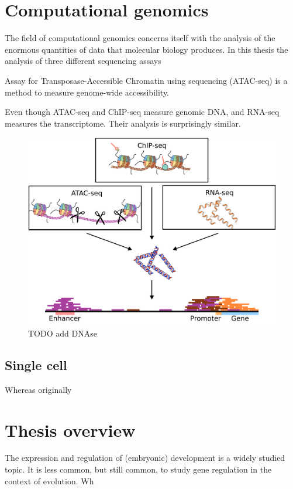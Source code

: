 \section{Computational genomics}

The field of computational genomics concerns itself with the analysis of the enormous quantities of data that molecular biology produces. In this thesis the analysis of three different sequencing assays 

Assay for Transposase-Accessible Chromatin using sequencing (ATAC-seq) is a method to measure genome-wide accessibility. 

Even though ATAC-seq and ChIP-seq measure genomic DNA, and RNA-seq measures the transcriptome. Their analysis is surprisingly similar. 

\begin{figure}[H]
    \includegraphics[width=\linewidth]{ch.introduction/imgs/analysis.png}
    \caption{TODO add DNAse}
    \label{fig:analysis}
\end{figure}

\subsection{Single cell}

Whereas originally 

\section{Thesis overview}

The expression and regulation of (embryonic) development is a widely studied topic. It is less common, but still common, to study gene regulation in the context of evolution. Wh

